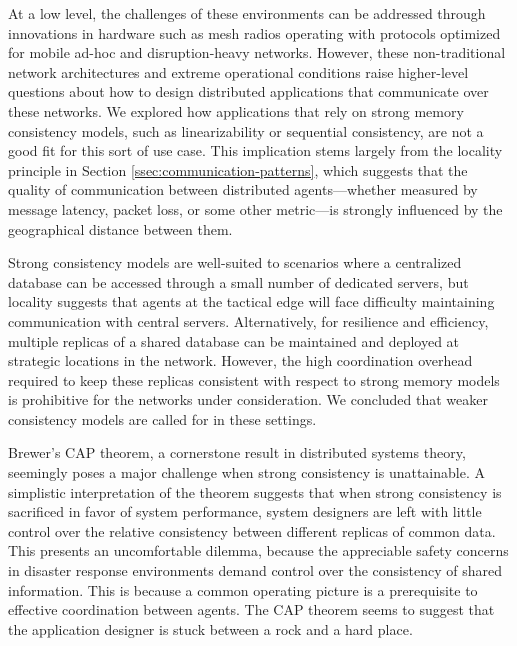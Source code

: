 \documentclass[]             %
{NASA}                       %
\theoremstyle{definition}
\begin{document}
At a low level, the challenges of these environments can be addressed
through innovations in hardware such as mesh radios operating with
protocols optimized for mobile ad-hoc and disruption-heavy
networks. However, these non-traditional network architectures and
extreme operational conditions raise higher-level questions about how
to design distributed applications that communicate over these
networks. We explored how applications that rely on strong memory
consistency models, such as linearizability or sequential consistency,
are not a good fit for this sort of use case. This implication
stems largely from the locality principle in Section
\ref{ssec:communication-patterns}, which suggests that the quality of
communication between distributed agents---whether measured by message
latency, packet loss, or some other metric---is strongly influenced by
the geographical distance between them.

Strong consistency models are well-suited to scenarios where a
centralized database can be accessed through a small number of
dedicated servers, but locality suggests that agents at the tactical
edge will face difficulty maintaining communication with central
servers. Alternatively, for resilience and efficiency, multiple
replicas of a shared database can be maintained and deployed at
strategic locations in the network. However, the high coordination
overhead required to keep these replicas consistent with respect to
strong memory models is prohibitive for the networks under
consideration. We concluded that weaker consistency models are called
for in these settings.

Brewer's CAP theorem, a cornerstone result in distributed systems
theory, seemingly poses a major challenge when strong consistency is
unattainable. A simplistic interpretation of the theorem suggests that
when strong consistency is sacrificed in favor of system performance,
system designers are left with little control over the relative
consistency between different replicas of common data. This presents
an uncomfortable dilemma, because the appreciable safety concerns in
disaster response environments demand control over the consistency of
shared information. This is because a common operating picture is a
prerequisite to effective coordination between agents. The CAP theorem
seems to suggest that the application designer is stuck between a rock
and a hard place.
\end{document}
